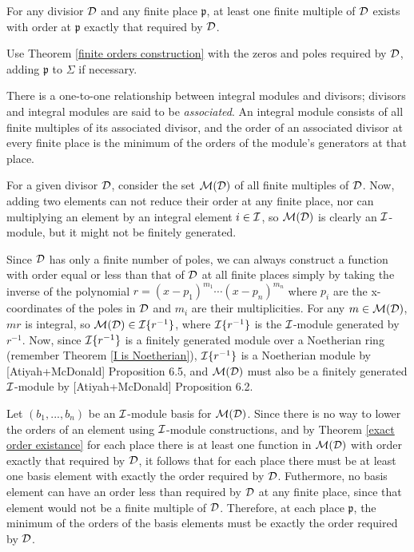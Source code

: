 \theorem
\label{exact order existance}

For any divisior ${\cal D}$ and any finite place $\mathfrak{p}$,
at least one finite multiple of ${\cal D}$ exists with order at $\mathfrak{p}$
exactly that required by ${\cal D}$.

\proof

Use Theorem \ref{finite orders construction} with the zeros and poles
required by ${\cal D}$, adding $\mathfrak{p}$
to $\Sigma$ if necessary.

\endtheorem

\theorem
\label{divisor-module isomorphism}

There is a one-to-one relationship between integral modules and
divisors; divisors and integral modules are said to be {\it
associated}.  An integral module consists of all finite multiples of
its associated divisor, and the order of an associated divisor at
every finite place is the minimum of the orders of the module's
generators at that place.

\proof

For a given divisor ${\cal D}$, consider the set ${\cal M}({\cal D})$
of all finite multiples of ${\cal D}$.
Now, adding two
elements can not reduce their order at any finite place, nor can
multiplying an element by an integral element $i \in {\cal I}$, so
${\cal M}({\cal D})$ is clearly an ${\cal I}$-module, but it
might not be finitely generated.

Since ${\cal D}$ has only a finite number of poles, we can always
construct a function with order equal or less than that of ${\cal D}$
at all finite places simply by taking the inverse of the polynomial
$r=(x-p_1)^{m_1} \cdots (x-p_n)^{m_n}$ where $p_i$ are the x-coordinates
of the poles in ${\cal D}$ and $m_i$ are their multiplicities.
For any $m \in {\cal M}({\cal D})$, $mr$ is integral, so ${\cal M}({\cal D})
\in {\cal I}\{r^{-1}\}$, where ${\cal I}\{r^{-1}\}$ is the ${\cal I}$-module
generated by $r^{-1}$.  Now, since ${\cal I}\{r^{-1}\}$ is a finitely
generated module over a Noetherian ring (remember Theorem \ref{I is
Noetherian}), ${\cal I}\{r^{-1}\}$ is a Noetherian module by
[Atiyah+McDonald] Proposition 6.5, and ${\cal M}({\cal D})$ must also
be a finitely generated ${\cal I}$-module by [Atiyah+McDonald]
Proposition 6.2.

Let $(b_1,...,b_n)$ be an ${\cal I}$-module basis for ${\cal M}({\cal
D})$.  Since there is no way to lower the orders of an element using
${\cal I}$-module constructions, and by Theorem \ref{exact order
existance} for each place there is at least one function in ${\cal
M}({\cal D})$ with order exactly that required by ${\cal D}$, it
follows that for each place there must be at least one basis element
with exactly the order required by ${\cal D}$.  Futhermore, no basis
element can have an order less than required by ${\cal D}$ at any
finite place, since that element would not be a finite multiple of
${\cal D}$.  Therefore, at each place $\mathfrak{p}$, the minimum of
the orders of the basis elements must be exactly the order required by
${\cal D}$.

